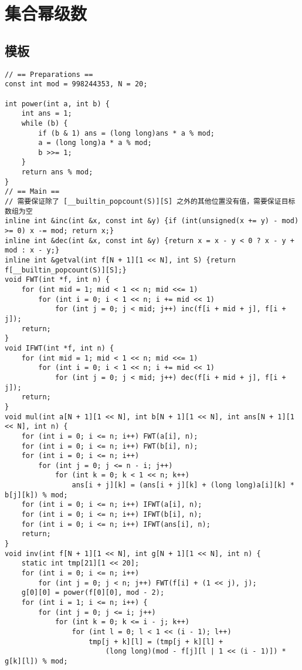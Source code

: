 \section{集合幂级数}

\subsection{模板}

\begin{verbatim}
// == Preparations ==
const int mod = 998244353, N = 20;

int power(int a, int b) {
    int ans = 1;
    while (b) {
        if (b & 1) ans = (long long)ans * a % mod;
        a = (long long)a * a % mod;
        b >>= 1;
    }
    return ans % mod;
}
// == Main ==
// 需要保证除了 [__builtin_popcount(S)][S] 之外的其他位置没有值，需要保证目标数组为空
inline int &inc(int &x, const int &y) {if (int(unsigned(x += y) - mod) >= 0) x -= mod; return x;}
inline int &dec(int &x, const int &y) {return x = x - y < 0 ? x - y + mod : x - y;}
inline int &getval(int f[N + 1][1 << N], int S) {return f[__builtin_popcount(S)][S];}
void FWT(int *f, int n) {
    for (int mid = 1; mid < 1 << n; mid <<= 1)
        for (int i = 0; i < 1 << n; i += mid << 1)
            for (int j = 0; j < mid; j++) inc(f[i + mid + j], f[i + j]);
    return;
}
void IFWT(int *f, int n) {
    for (int mid = 1; mid < 1 << n; mid <<= 1)
        for (int i = 0; i < 1 << n; i += mid << 1)
            for (int j = 0; j < mid; j++) dec(f[i + mid + j], f[i + j]);
    return;
}
void mul(int a[N + 1][1 << N], int b[N + 1][1 << N], int ans[N + 1][1 << N], int n) {
    for (int i = 0; i <= n; i++) FWT(a[i], n);
    for (int i = 0; i <= n; i++) FWT(b[i], n);
    for (int i = 0; i <= n; i++)
        for (int j = 0; j <= n - i; j++)
            for (int k = 0; k < 1 << n; k++)
                ans[i + j][k] = (ans[i + j][k] + (long long)a[i][k] * b[j][k]) % mod;
    for (int i = 0; i <= n; i++) IFWT(a[i], n);
    for (int i = 0; i <= n; i++) IFWT(b[i], n);
    for (int i = 0; i <= n; i++) IFWT(ans[i], n);
    return;
}
void inv(int f[N + 1][1 << N], int g[N + 1][1 << N], int n) {
    static int tmp[21][1 << 20];
    for (int i = 0; i <= n; i++)
        for (int j = 0; j < n; j++) FWT(f[i] + (1 << j), j);
    g[0][0] = power(f[0][0], mod - 2);
    for (int i = 1; i <= n; i++) {
        for (int j = 0; j <= i; j++)
            for (int k = 0; k <= i - j; k++)
                for (int l = 0; l < 1 << (i - 1); l++)
                    tmp[j + k][l] = (tmp[j + k][l] +
                        (long long)(mod - f[j][l | 1 << (i - 1)]) * g[k][l]) % mod;

\end{verbatim}

